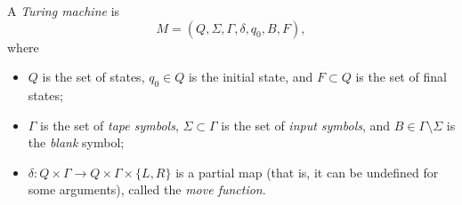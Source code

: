 

\setcounter{section}{8}
\setcounter{subsection}{1}
\setcounter{dfn}{1}

\begin{dfn}
A \emph{Turing machine} is
\[
M = (Q, \Sigma, \Gamma, \delta, q_0, B, F),
\]
where
\begin{itemize}
\item
$Q$ is the set of states, $q_0 \in Q$ is the initial state, and $F \subset Q$ is the set of final states;
\item
$\Gamma$ is the set of \emph{tape symbols}, $\Sigma \subset \Gamma$ is the set of \emph{input symbols},
and $B \in \Gamma \setminus \Sigma$ is the \emph{blank} symbol;
\item
$\delta \colon Q \times \Gamma \to Q \times \Gamma \times \{L, R\}$
is a partial map (that is, it can be undefined for some arguments), called the \emph{move function}.
\end{itemize}
\end{dfn}

